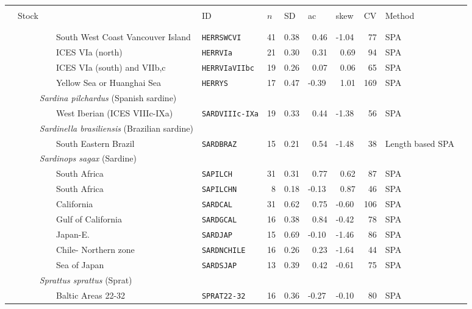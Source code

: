 \newpage
\begin{flushleft}
\begin{tabular*}{7.1in}{llllllllll} 
\hline \\ 
&{\normalsize Stock}&{\normalsize ID}&{\normalsize $n$}&{\normalsize SD}&{\normalsize ac}&{\normalsize skew}&{\normalsize CV}&{\normalsize Method}  & \\ 
 &&&&&&&&&\\ 
  \hline  &&&&&&&&&\\ 
&~~~~~~~~~South West Coast Vancouver Island&{\tt HERRSWCVI}&41&0.38&~0.46&-1.04&~77&SPA  & \\ 
&~~~~~~~~~ICES VIa (north)&{\tt HERRVIa}&21&0.30&~0.31&~0.69&~94&SPA  & \\ 
&~~~~~~~~~ICES VIa (south) and VIIb,c&{\tt HERRVIaVIIbc}&19&0.26&~0.07&~0.06&~65&SPA  & \\ 
&~~~~~~~~~Yellow Sea or Huanghai Sea&{\tt HERRYS}&17&0.47&-0.39&~1.01&169&SPA  & \\ 
&{\it~~~~~Sardina pilchardus} (Spanish sardine)&~&~&~&~&~&~&~  & \\ 
&~~~~~~~~~West Iberian (ICES VIIIc-IXa)&{\tt SARDVIIIc-IXa}&19&0.33&~0.44&-1.38&~56&SPA  & \\ 
&{\it~~~~~Sardinella brasiliensis} (Brazilian sardine)&~&~&~&~&~&~&~  & \\ 
&~~~~~~~~~South Eastern Brazil&{\tt SARDBRAZ}&15&0.21&~0.54&-1.48&~38&Length based SPA  & \\ 
&{\it~~~~~Sardinops sagax} (Sardine)&~&~&~&~&~&~&~  & \\ 
&~~~~~~~~~South Africa&{\tt SAPILCH}&31&0.31&~0.77&~0.62&~87&SPA  & \\ 
&~~~~~~~~~South Africa&{\tt SAPILCHN}&~8&0.18&-0.13&~0.87&~46&SPA  & \\ 
&~~~~~~~~~California&{\tt SARDCAL}&31&0.62&~0.75&-0.60&106&SPA  & \\ 
&~~~~~~~~~Gulf of California&{\tt SARDGCAL}&16&0.38&~0.84&-0.42&~78&SPA  & \\ 
&~~~~~~~~~Japan-E.&{\tt SARDJAP}&15&0.69&-0.10&-1.46&~86&SPA  & \\ 
&~~~~~~~~~Chile- Northern zone&{\tt SARDNCHILE}&16&0.26&~0.23&-1.64&~44&SPA  & \\ 
&~~~~~~~~~Sea of Japan&{\tt SARDSJAP}&13&0.39&~0.42&-0.61&~75&SPA  & \\ 
&{\it~~~~~Sprattus sprattus} (Sprat)&~&~&~&~&~&~&~  & \\ 
&~~~~~~~~~Baltic Areas 22-32&{\tt SPRAT22-32}&16&0.36&-0.27&-0.10&~80&SPA  & \\ 

\end{tabular*}
\end{flushleft}
